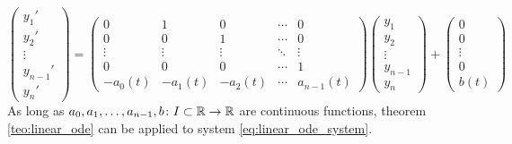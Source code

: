 \begin{equation} \label{eq:linear_ode_system}
	\begin{pmatrix}
		y_1' \\ y_2' \\ \vdots \\ y_{n-1}' \\ y_n'
	\end{pmatrix} = 
	\begin{pmatrix}
		0 & 1 & 0 & \cdots & 0 \\
		0 & 0 & 1 & \cdots & 0 \\
		\vdots & \vdots & \vdots & \ddots & \vdots \\
		0 & 0 & 0 & \cdots & 1 \\
		-a_0(t) & -a_1(t) & -a_2(t) & \cdots & a_{n-1}(t)
	\end{pmatrix}
	\begin{pmatrix}
		y_1 \\ y_2 \\ \vdots \\ y_{n-1} \\ y_n
	\end{pmatrix} + 
	\begin{pmatrix}
		0 \\ 0 \\ \vdots \\ 0 \\ b(t)
	\end{pmatrix}
\end{equation}
As long as $a_0, a_1, \ldots, a_{n-1}, b \colon I \subset \mathbb{R} \to \mathbb{R}$ are
continuous functions, theorem \ref{teo:linear_ode} can be applied to system
\eqref{eq:linear_ode_system}.


